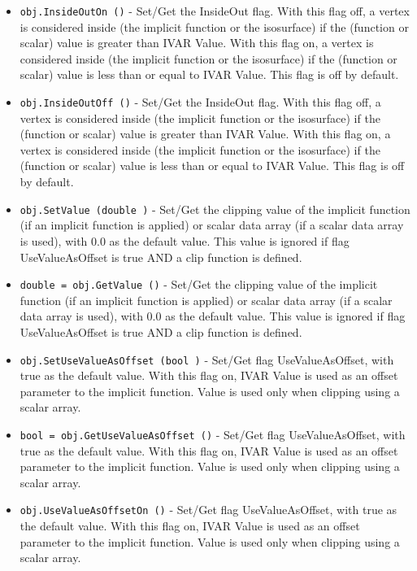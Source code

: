 \begin{itemize}
\item  \verb|obj.InsideOutOn ()| -  Set/Get the InsideOut flag. With this flag off, a vertex is considered
 inside (the implicit function or the isosurface) if the (function or scalar)
 value is greater than IVAR Value. With this flag on, a vertex is considered
 inside (the implicit function or the isosurface) if the (function or scalar)
 value is less than or equal to IVAR Value. This flag is off by default.

\item  \verb|obj.InsideOutOff ()| -  Set/Get the InsideOut flag. With this flag off, a vertex is considered
 inside (the implicit function or the isosurface) if the (function or scalar)
 value is greater than IVAR Value. With this flag on, a vertex is considered
 inside (the implicit function or the isosurface) if the (function or scalar)
 value is less than or equal to IVAR Value. This flag is off by default.

\item  \verb|obj.SetValue (double )| -  Set/Get the clipping value of the implicit function (if an implicit function
 is applied) or scalar data array (if a scalar data array is used), with 0.0
 as the default value. This value is ignored if flag UseValueAsOffset is true
 AND a clip function is defined.

\item  \verb|double = obj.GetValue ()| -  Set/Get the clipping value of the implicit function (if an implicit function
 is applied) or scalar data array (if a scalar data array is used), with 0.0
 as the default value. This value is ignored if flag UseValueAsOffset is true
 AND a clip function is defined.

\item  \verb|obj.SetUseValueAsOffset (bool )| -  Set/Get flag UseValueAsOffset, with true as the default value. With this flag
 on, IVAR Value is used as an offset parameter to the implicit function. Value 
 is used only when clipping using a scalar array.

\item  \verb|bool = obj.GetUseValueAsOffset ()| -  Set/Get flag UseValueAsOffset, with true as the default value. With this flag
 on, IVAR Value is used as an offset parameter to the implicit function. Value 
 is used only when clipping using a scalar array.

\item  \verb|obj.UseValueAsOffsetOn ()| -  Set/Get flag UseValueAsOffset, with true as the default value. With this flag
 on, IVAR Value is used as an offset parameter to the implicit function. Value 
 is used only when clipping using a scalar array.


\end{itemize}
